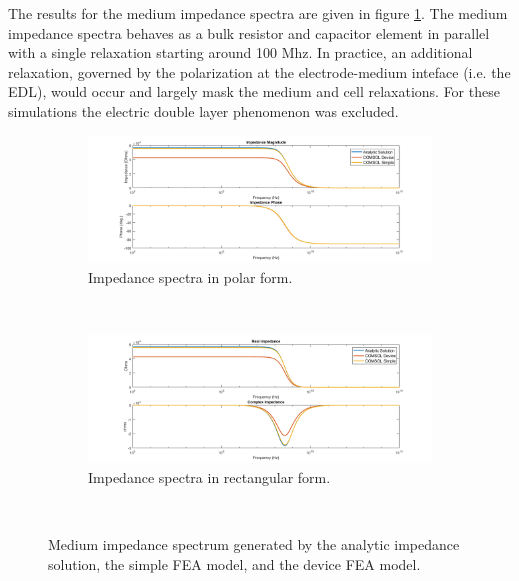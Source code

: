 \par The results for the medium impedance spectra are given in figure \ref{fig:medium_model_IS_data}. The medium impedance spectra behaves as a bulk resistor and capacitor element in parallel with a single relaxation starting around 100 Mhz. In practice, an additional relaxation, governed by the polarization at the electrode-medium inteface (i.e. the EDL), would occur and largely mask the medium and cell relaxations. For these simulations the electric double layer phenomenon was excluded.

\begin{figure}[h]
    \centering
    \begin{subfigure}[b]{\textwidth}
        \centering
        \includegraphics[width=\textwidth]{images/IS_model_medium_mag_phase.png}
        \caption{Impedance spectra in polar form.}
    \end{subfigure}
    \\
    \vspace{0.1 in}
    \begin{subfigure}[b]{\textwidth}
        \centering
        \includegraphics[width=\textwidth]{images/IS_model_medium_real_imag.png}
        \caption{Impedance spectra in rectangular form.}
    \end{subfigure}
    \\
    \vspace{0.1 in}
    \caption[Analyitic and FEA generated medium impedance spectrum]{Medium impedance spectrum generated by the analytic impedance solution, the simple FEA model, and the device FEA model.}
    \label{fig:medium_model_IS_data}
\end{figure}

